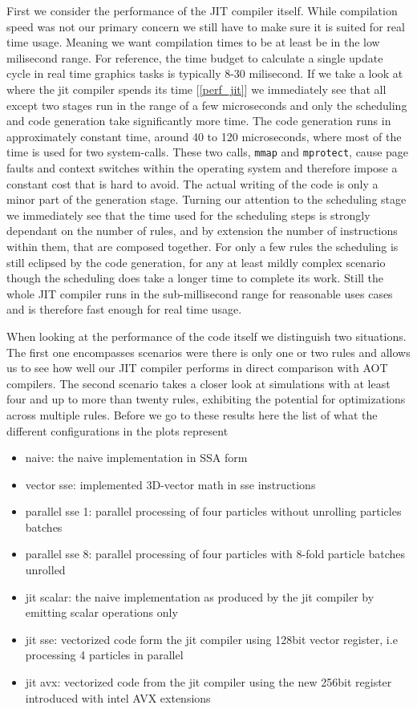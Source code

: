 First we consider the performance of the JIT compiler itself. While compilation speed was not our primary concern we still have to make sure it is suited for real time usage. Meaning we want compilation times to be at least be in the low milisecond range. For reference, the time budget to calculate a single update cycle in real time graphics tasks is typically 8-30 milisecond.
If we take a look at where the jit compiler spends its time [\ref{perf_jit}] we immediately see that all except two stages run in the range of a few microseconds and only the scheduling and code generation take significantly more time. The code generation runs in approximately constant time, around 40 to 120 microseconds, where most of the time is used for two system-calls. These two calls, \texttt{mmap} and \texttt{mprotect}, cause page faults and context switches within the operating system and therefore impose a constant cost that is hard to avoid. The actual writing of the code is only a minor part of the generation stage. Turning our attention to the scheduling stage we immediately see that the time used for the scheduling steps is strongly dependant on the number of rules, and by extension the number of instructions within them, that are composed together. For only a few rules the scheduling is still eclipsed by the code generation, for any at least mildly complex scenario though the scheduling does take a longer time to complete its work. Still the whole JIT compiler runs in the sub-millisecond range for reasonable uses cases and is therefore fast enough for real time usage.


When looking at the performance of the code itself we distinguish two situations. The first one encompasses scenarios were there is only one or two rules and allows us to see how well our JIT compiler performs in direct comparison with AOT compilers. The second scenario takes a closer look at simulations with at least four and up to more than twenty rules, exhibiting the potential for optimizations across multiple rules. Before we go to these results here the list of what the different configurations in the plots represent
\begin{itemize}
\item naive: the naive implementation in SSA form
\item vector sse: implemented 3D-vector math in sse instructions
\item parallel sse 1: parallel processing of four particles without unrolling particles batches
\item parallel sse 8: parallel processing of four particles with 8-fold particle batches unrolled
\item jit scalar: the naive implementation as produced by the jit compiler by emitting scalar operations only
\item jit sse: vectorized code form the jit compiler using 128bit vector register, i.e processing 4 particles in parallel
\item jit avx: vectorized code from the jit compiler using the new 256bit register introduced with intel AVX extensions
\end{itemize}

